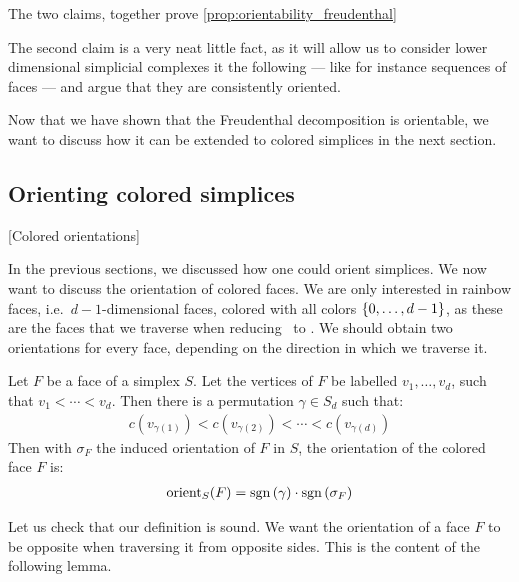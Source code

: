 The two claims, together prove \cref{prop:orientability_freudenthal}

The second claim is a very neat little fact, as it will allow us to consider lower dimensional simplicial complexes it the following --- like for instance sequences of faces --- and argue that they are consistently oriented.

Now that we have shown that the Freudenthal decomposition is orientable, we want to discuss how it can be extended to colored simplices in the next section.

\subsection{Orienting colored simplices}[Colored orientations]

In the previous sections, we discussed how one could orient simplices. We now want to discuss the orientation of colored faces. We are only interested in rainbow faces, i.e.~$d-1$-dimensional faces, colored with all colors $\left\{0, \dots, d-1\right\}$, as these are the faces that we traverse when reducing \Sperner\ to \EndOfLine. We should obtain two orientations for every face, depending on the direction in which we traverse it.

\begin{definition}
	Let $F$ be a face of a simplex $S$. Let the vertices of $F$ be labelled $v_1, \dots, v_d$, such that $v_1 < \cdots < v_d$. Then there is a permutation $\gamma \in S_d$ such that:
	\begin{align*}
		c(v_{\gamma(1)}) < c(v_{\gamma(2)}) < \cdots < c(v_{\gamma(d)})
	\end{align*}
	Then with $\sigma_F$ the induced orientation of $F$ in $S$, the orientation of the colored face $F$ is:
	\begin{align*}
		\operatorname{orient}_S(F) = \operatorname{sgn}\left(\gamma\right) \cdot \operatorname{sgn}\left(\sigma_F\right)
	\end{align*}
\end{definition}

Let us check that our definition is sound. We want the orientation of a face $F$ to be opposite when traversing it from opposite sides. This is the content of the following lemma.

